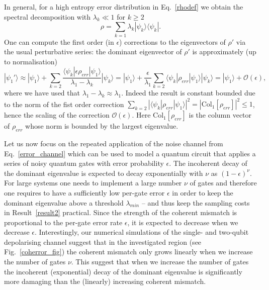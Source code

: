 \documentclass[aps,prx,showpacs,twocolumn,reprint]{revtex4-2}
\begin{document}
{In general, for a high entropy error distribution in Eq.~\eqref{rhodef} we obtain
the spectral decomposition with $\lambda_k \ll 1$ for $k\geq2$
\begin{equation*}
	\rho = \sum_{k=1}  \lambda_k |\psi_k \rangle \langle \psi_k |.
\end{equation*}
One can compute the first order (in $\epsilon$) corrections
to the eigenvectors of $\rho'$ via the usual perturbative series:
the dominant eigenvector of $\rho'$ is approximately (up to normalisation)
\begin{equation*}
	|\psi_1' \rangle  \approx |\psi_1 \rangle + \sum_{k=2}\frac{\langle \psi_k | \epsilon \rho_{err} | \psi_1 \rangle}{ \lambda_1 - \lambda_k} | \psi_k \rangle
	=
	|\psi_1 \rangle  
	+ \frac{\epsilon}{\lambda_1} \sum_{k=2}  \langle \psi_k | \rho_{err} | \psi_1 \rangle  | \psi_k \rangle
	= |\psi_1 \rangle  + \mathcal{O}(\epsilon) ,
\end{equation*}
where we have used that $ \lambda_1 - \lambda_k \approx \lambda_1$.
Indeed the result is constant bounded due to the norm of the fist order correction
$\sum_{k=2}  |\langle \psi_k | \rho_{err} | \psi_1 \rangle  |^2 = |\mathrm{Col}_1[\rho_{err}]|^2 \leq 1$, hence
the scaling of the correction $\mathcal{O}(\epsilon)$. Here $\mathrm{Col}_1[\rho_{err}]$ is the column  vector of $\rho_{err}$
whose norm is bounded by the largest eigenvalue.





	Let us now focus on the repeated application of the noise channel from Eq.~\eqref{error_channel} which can be used to model
	a quantum circuit that applies a series of noisy quantum gates with error probability $\epsilon$.
	The incoherent decay of the dominant eigenvalue is expected to decay exponentially with $\nu$ as $(1-\epsilon)^\nu$.
	For large systems one needs to implement a large number $\nu$ of gates 
	and therefore one requires to have a sufficiently low per-gate error $\epsilon$
	in order to keep the dominant eigenvalue above a threshold $\lambda_{min}$ -- and thus
	keep the sampling costs in Result~\ref{result2} practical.
	Since the strength of the coherent mismatch is proportional to the per-gate error rate $\epsilon$,
	it is expected to decrease when we decrease $\epsilon$.
	Interestingly, our numerical simulations of the single- and two-qubit depolarising channel suggest
	that in the investigated region (see Fig.~\ref{coherror_fig}) the coherent mismatch only grows linearly
	when we increase the number of gates $\nu$.	
	This suggest that when we increase the number of gates the incoherent (exponential) decay of the
	dominant eigenvalue is significantly more damaging than the (linearly) increasing coherent mismatch.
	
}
\end{document}
